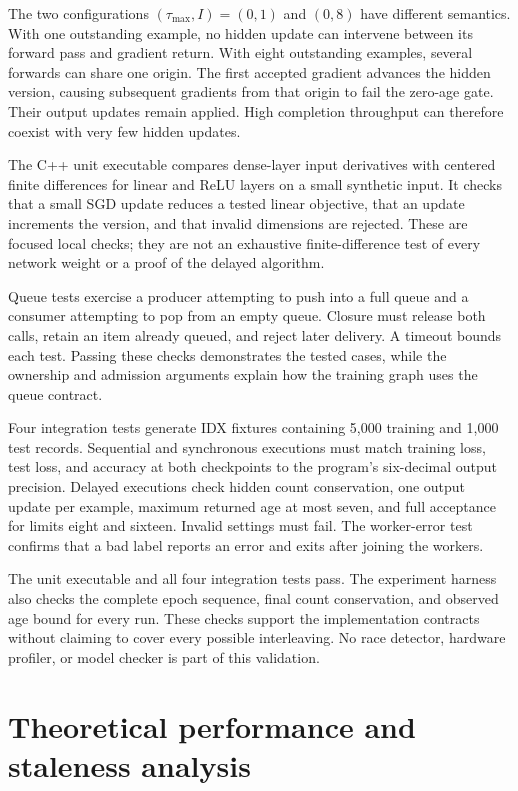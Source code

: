 \documentclass[conference]{IEEEtran}
\newcommand{\taumax}{\tau_{\max}}
\begin{document}
The two configurations $(\taumax,I)=(0,1)$ and $(0,8)$ have different semantics. With one outstanding example, no hidden update can intervene between its forward pass and gradient return. With eight outstanding examples, several forwards can share one origin. The first accepted gradient advances the hidden version, causing subsequent gradients from that origin to fail the zero-age gate. Their output updates remain applied. High completion throughput can therefore coexist with very few hidden updates.

The C++ unit executable compares dense-layer input derivatives with centered finite differences for linear and ReLU layers on a small synthetic input. It checks that a small SGD update reduces a tested linear objective, that an update increments the version, and that invalid dimensions are rejected. These are focused local checks; they are not an exhaustive finite-difference test of every network weight or a proof of the delayed algorithm.

Queue tests exercise a producer attempting to push into a full queue and a consumer attempting to pop from an empty queue. Closure must release both calls, retain an item already queued, and reject later delivery. A timeout bounds each test. Passing these checks demonstrates the tested cases, while the ownership and admission arguments explain how the training graph uses the queue contract.

Four integration tests generate IDX fixtures containing 5,000 training and 1,000 test records. Sequential and synchronous executions must match training loss, test loss, and accuracy at both checkpoints to the program's six-decimal output precision. Delayed executions check hidden count conservation, one output update per example, maximum returned age at most seven, and full acceptance for limits eight and sixteen. Invalid settings must fail. The worker-error test confirms that a bad label reports an error and exits after joining the workers.

The unit executable and all four integration tests pass. The experiment harness also checks the complete epoch sequence, final count conservation, and observed age bound for every run. These checks support the implementation contracts without claiming to cover every possible interleaving. No race detector, hardware profiler, or model checker is part of this validation.

\section{Theoretical performance and staleness analysis}
\end{document}
